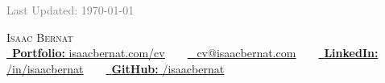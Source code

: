 \documentclass[a4paper,11pt]{article}
\begin{document}

\noindent\textcolor{grey}{\small\hfill Last Updated: \today}
\vspace{-1em} %

\begin{center}
    {\Huge \scshape Isaac Bernat} \\ \vspace{1pt}
    \small 
    \href{https://www.isaacbernat.com/cv}{\raisebox{-0.1\height}\faLink\ \textbf{Portfolio:} \underline{isaacbernat.com/cv}} ~ \textbullet ~
    \href{mailto:cv@isaacbernat.com}{\raisebox{-0.1\height}\faEnvelope\ 
    \underline{cv@isaacbernat.com}} ~ \textbullet ~
    \href{https://linkedin.com/in/isaacbernat}{\raisebox{-0.1\height}\faLinkedin\ \textbf{LinkedIn:} \underline{/in/isaacbernat}} ~ \textbullet ~
    \href{https://github.com/isaacbernat}{\raisebox{-0.1\height}\faGithub\ \textbf{GitHub:} \underline{/isaacbernat}}
    \vspace{-8pt}
\end{center}


\end{document}
